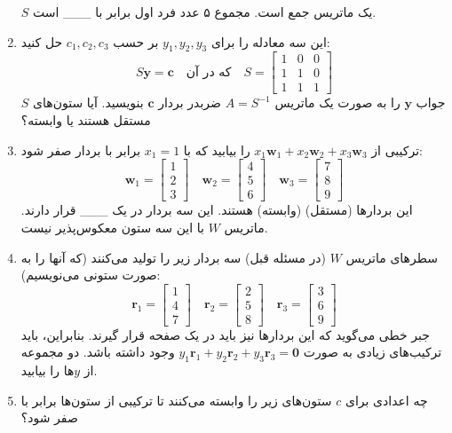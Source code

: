 \documentclass[12pt, a4paper]{book}
\begin{document}
\begin{enumerate}
		$S$ یک ماتریس جمع است. مجموع ۵ عدد فرد اول برابر با \_\_\_ است.
		\item این سه معادله را برای $y_1, y_2, y_3$ بر حسب $c_1, c_2, c_3$ حل کنید:
		\[ S\mathbf{y} = \mathbf{c} \quad \text{که در آن} \quad S = \begin{bmatrix} 1 & 0 & 0 \\ 1 & 1 & 0 \\ 1 & 1 & 1 \end{bmatrix} \]
		جواب $\mathbf{y}$ را به صورت یک ماتریس $A=S^{-1}$ ضربدر بردار $\mathbf{c}$ بنویسید. آیا ستون‌های $S$ مستقل هستند یا وابسته؟
		\item ترکیبی از $x_1\mathbf{w}_1+x_2\mathbf{w}_2+x_3\mathbf{w}_3$ را بیابید که با $x_1=1$ برابر با بردار صفر شود:
		\[ \mathbf{w}_1 = \begin{bmatrix} 1 \\ 2 \\ 3 \end{bmatrix} \quad \mathbf{w}_2 = \begin{bmatrix} 4 \\ 5 \\ 6 \end{bmatrix} \quad \mathbf{w}_3 = \begin{bmatrix} 7 \\ 8 \\ 9 \end{bmatrix} \]
		این بردارها (مستقل) (وابسته) هستند. این سه بردار در یک \_\_\_ قرار دارند. ماتریس $W$ با این سه ستون معکوس‌پذیر نیست.
		\item سطرهای ماتریس $W$ (در مسئله قبل) سه بردار زیر را تولید می‌کنند (که آنها را به صورت ستونی می‌نویسیم):
		\[ \mathbf{r}_1 = \begin{bmatrix} 1 \\ 4 \\ 7 \end{bmatrix} \quad \mathbf{r}_2 = \begin{bmatrix} 2 \\ 5 \\ 8 \end{bmatrix} \quad \mathbf{r}_3 = \begin{bmatrix} 3 \\ 6 \\ 9 \end{bmatrix} \]
		جبر خطی می‌گوید که این بردارها نیز باید در یک صفحه قرار گیرند. بنابراین، باید ترکیب‌های زیادی به صورت $y_1\mathbf{r}_1 + y_2\mathbf{r}_2 + y_3\mathbf{r}_3 = \mathbf{0}$ وجود داشته باشد. دو مجموعه از $y$ها را بیابید.
		\item چه اعدادی برای $c$ ستون‌های زیر را وابسته می‌کنند تا ترکیبی از ستون‌ها برابر با صفر شود؟

\end{enumerate}
\end{document}
